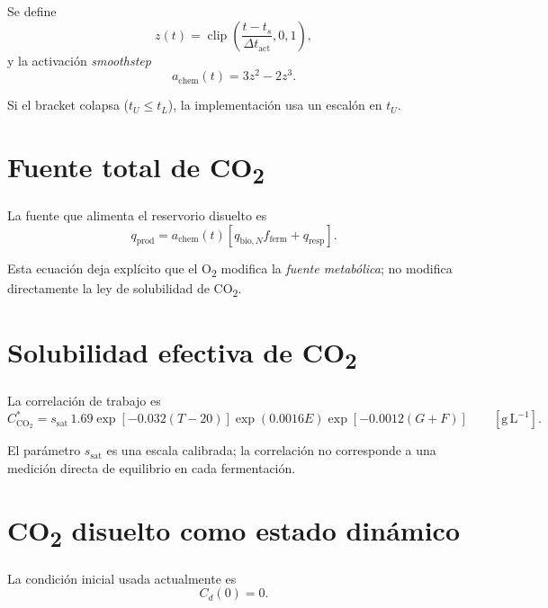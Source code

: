 \documentclass[11pt,a4paper]{article}
\newcommand{\COtwo}{\mathrm{CO_2}}
\newcommand{\clip}{\operatorname{clip}}
\newcommand{\gL}{\mathrm{g\,L^{-1}}}
\begin{document}
Se define
\begin{equation}
z(t)=
\clip\left(
\frac{t-t_s}{\Delta t_{\mathrm{act}}},
0,1
\right),
\end{equation}
y la activación \emph{smoothstep}
\begin{equation}
\boxed{
a_{\mathrm{chem}}(t)
=
3z^2-2z^3.
}
\label{eq:achem}
\end{equation}

Si el bracket colapsa ($t_U\le t_L$), la implementación usa un escalón en $t_U$.

\section{Fuente total de CO\textsubscript{2}}

La fuente que alimenta el reservorio disuelto es
\begin{equation}
\boxed{
q_{\mathrm{prod}}
=
a_{\mathrm{chem}}(t)
\left[
q_{\mathrm{bio},N}
f_{\mathrm{ferm}}
+
q_{\mathrm{resp}}
\right].
}
\label{eq:qprod}
\end{equation}

Esta ecuación deja explícito que el O\textsubscript{2} modifica la \emph{fuente metabólica}; no
modifica directamente la ley de solubilidad de CO\textsubscript{2}.

\section{Solubilidad efectiva de CO\textsubscript{2}}

La correlación de trabajo es
\begin{equation}
\boxed{
C_{\COtwo}^{\ast}
=
s_{\mathrm{sat}}\,
1.69
\exp[-0.032(T-20)]
\exp(0.0016E)
\exp[-0.0012(G+F)]
}
\qquad [\gL].
\label{eq:csat}
\end{equation}

El parámetro $s_{\mathrm{sat}}$ es una escala calibrada; la correlación no corresponde a una
medición directa de equilibrio en cada fermentación.

\section{CO\textsubscript{2} disuelto como estado dinámico}

La condición inicial usada actualmente es
\begin{equation}
\boxed{
C_d(0)=0.
}
\label{eq:cd0}
\end{equation}
\end{document}
